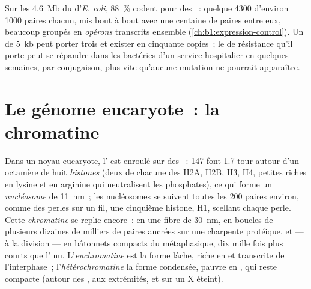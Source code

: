 \begin{example}\label{ex:b1:genomes:dense}
Sur les \qty{4.6}{Mb} du  d'\emph{E. coli}, \qty{88}{\%}
codent pour des ~: quelque \num{4300}  d'environ
\num{1000} paires chacun, mis bout à bout avec une centaine de paires
entre eux, beaucoup groupés en \emph{opérons} transcrits ensemble
(\cref{ch:b1:expression-control}). Un  de \qty{5}{kb} peut
porter trois  et exister en cinquante copies~; le  de
résistance qu'il porte peut se répandre dans les bactéries d'un service
hospitalier en quelques semaines, par conjugaison, plus vite qu'aucune
mutation ne pourrait apparaître.
\end{example}

\section{Le génome eucaryote~: la chromatine}

\begin{definition}\label{def:b1:genomes:nucleosome}
Dans un noyau eucaryote, l' est enroulé sur des ~:
\qty{147}{}  font 1.7 tour autour d'un octamère de huit
\emph{histones} (deux de chacune des H2A, H2B, H3, H4, petites 
riches en lysine et en arginine qui neutralisent les phosphates), ce qui
forme un \emph{nucléosome} de \qty{11}{nm}~; les
nucléosomes se suivent toutes les \qty{200}{} paires environ, comme des
perles sur un fil, une cinquième histone, H1, scellant chaque perle.
Cette \emph{chromatine} se replie encore~: en une fibre de \qty{30}{nm},
en boucles de plusieurs dizaines de milliers de paires ancrées sur une
charpente protéique, et --- à la division --- en bâtonnets compacts du
 métaphasique, dix mille fois plus courts que l' nu.
L'\emph{euchromatine} est la forme lâche, riche en  et transcrite
de l'interphase~; l'\emph{hétérochromatine} la forme condensée, pauvre
en , qui reste compacte (autour des , aux extrémités, et
sur un  X éteint).
\end{definition}

